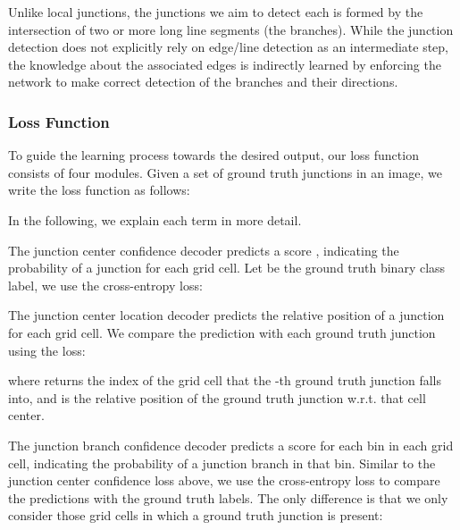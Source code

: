 \documentclass[10pt,twocolumn,letterpaper]{article}
\begin{document}
Unlike local junctions, the junctions we aim to detect each is formed by the intersection of two or more long line segments (the branches). While the junction detection does not explicitly rely on edge/line detection as an intermediate step, the knowledge about the associated edges is indirectly learned by enforcing the network to make correct detection of the branches and their directions.

 



\subsubsection{Loss Function}\vspace{-2mm}

To guide the learning process towards the desired output, our loss function consists of four modules. Given a set of ground truth junctions  in an image, we write the loss function as follows:\vspace{-2mm}

In the following, we explain each term in more detail.



 The junction center confidence decoder predicts a score , indicating the probability of a junction for each grid cell. Let  be the ground truth binary class label, we use the cross-entropy loss:


 The junction center location decoder predicts the relative position  of a junction for each grid cell. We compare the prediction with each ground truth junction using the  loss:\vspace{-2mm}

where  returns the index of the grid cell that the -th ground truth junction falls into, and  is the relative position of the ground truth junction w.r.t. that cell center.



 The junction branch confidence decoder predicts a score  for each bin in each grid cell, indicating the probability of a junction branch in that bin. Similar to the junction center confidence loss above, we use the cross-entropy loss to compare the predictions with the ground truth labels. The only difference is that we only consider those grid cells in which a ground truth junction is present:\vspace{-2mm}
\end{document}
